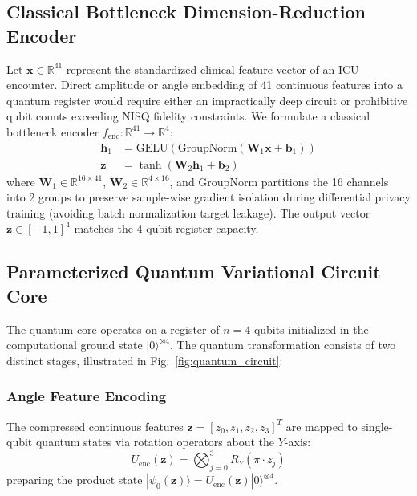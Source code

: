 \documentclass[conference]{IEEEtran}
\begin{document}
\subsection{Classical Bottleneck Dimension-Reduction Encoder}
Let $\mathbf{x} \in \mathbb{R}^{41}$ represent the standardized clinical feature vector of an ICU encounter. Direct amplitude or angle embedding of 41 continuous features into a quantum register would require either an impractically deep circuit or prohibitive qubit counts exceeding NISQ fidelity constraints. We formulate a classical bottleneck encoder $f_{\text{enc}}: \mathbb{R}^{41} \to \mathbb{R}^4$:
\begin{align}
    \mathbf{h}_1 &= \text{GELU}(\text{GroupNorm}(\mathbf{W}_1 \mathbf{x} + \mathbf{b}_1)) \\
    \mathbf{z} &= \tanh(\mathbf{W}_2 \mathbf{h}_1 + \mathbf{b}_2)
\end{align}
where $\mathbf{W}_1 \in \mathbb{R}^{16 \times 41}$, $\mathbf{W}_2 \in \mathbb{R}^{4 \times 16}$, and $\text{GroupNorm}$ partitions the 16 channels into 2 groups to preserve sample-wise gradient isolation during differential privacy training (avoiding batch normalization target leakage). The output vector $\mathbf{z} \in [-1, 1]^4$ matches the 4-qubit register capacity.

\subsection{Parameterized Quantum Variational Circuit Core}
The quantum core operates on a register of $n = 4$ qubits initialized in the computational ground state $|0\rangle^{\otimes 4}$. The quantum transformation consists of two distinct stages, illustrated in Fig.~\ref{fig:quantum_circuit}:

\subsubsection{Angle Feature Encoding}
The compressed continuous features $\mathbf{z} = [z_0, z_1, z_2, z_3]^T$ are mapped to single-qubit quantum states via rotation operators about the $Y$-axis:
\begin{equation}
    U_{\text{enc}}(\mathbf{z}) = \bigotimes_{j=0}^3 R_Y\left(\pi \cdot z_j\right)
\end{equation}
preparing the product state $|\psi_0(\mathbf{z})\rangle = U_{\text{enc}}(\mathbf{z}) |0\rangle^{\otimes 4}$.
\end{document}
